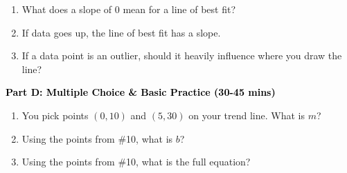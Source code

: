 \documentclass[12pt, letterpaper, fleqn]{article}
\newcommand{\blank}{\underline{\hspace{2.2cm}}}
\begin{document}
\begin{enumerate}[itemsep=2.5cm, leftmargin=0.6cm, resume]
\item What does a slope of 0 mean for a line of best fit? \blank
\item If data goes up, the line of best fit has a \blank slope.
\item If a data point is an outlier, should it heavily influence where you draw the line? \blank
\end{enumerate}

\newpage

\begin{tcolorbox}[colback=customteal!20]
\large\textcolor{black}{\textbf{Part D: Multiple Choice \& Basic Practice (30-45 mins)}}
\end{tcolorbox}

\vspace{3mm}

\begin{enumerate}[itemsep=2.5cm, leftmargin=0.6cm, resume]
\item You pick points $(0, 10)$ and $(5, 30)$ on your trend line. What is $m$? \blank
\item Using the points from \#10, what is $b$? \blank
\item Using the points from \#10, what is the full equation? \blank
\end{enumerate}
\end{document}
